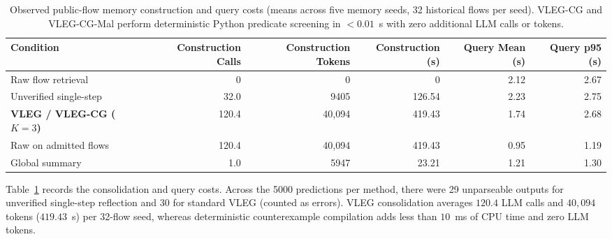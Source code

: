 \documentclass[10pt,a4paper,onecolumn]{article}
\theoremstyle{definition}
\theoremstyle{remark}
\begin{document}
\begin{table}[!t]
\centering
\caption{Observed public-flow memory construction and query costs (means across five memory seeds, 32 historical flows per seed). VLEG-CG and VLEG-CG-Mal perform deterministic Python predicate screening in $<0.01$~s with zero additional LLM calls or tokens.}
\label{tab:exp6_cost}
\small
\begin{tabular}{lrrrrr}
\toprule
\textbf{Condition} & \textbf{Construction Calls} & \textbf{Construction Tokens} & \textbf{Construction (s)} & \textbf{Query Mean (s)} & \textbf{Query p95 (s)} \\
\midrule
Raw flow retrieval & 0 & 0 & 0 & 2.12 & 2.67 \\
Unverified single-step & 32.0 & 9405 & 126.54 & 2.23 & 2.75 \\
\textbf{VLEG / VLEG-CG ($K{=}3$)} & 120.4 & 40,094 & 419.43 & 1.74 & 2.68 \\
Raw on admitted flows & 120.4 & 40,094 & 419.43 & 0.95 & 1.19 \\
Global summary & 1.0 & 5947 & 23.21 & 1.21 & 1.30 \\
\bottomrule
\end{tabular}
\end{table}

Table~\ref{tab:exp6_cost} records the consolidation and query costs. Across the 5000 predictions per method, there were 29 unparseable outputs for unverified single-step reflection and 30 for standard VLEG (counted as errors). VLEG consolidation averages $120.4$ LLM calls and $40,094$ tokens ($419.43$~s) per 32-flow seed, whereas deterministic counterexample compilation adds less than $10$~ms of CPU time and zero LLM tokens.
\end{document}
